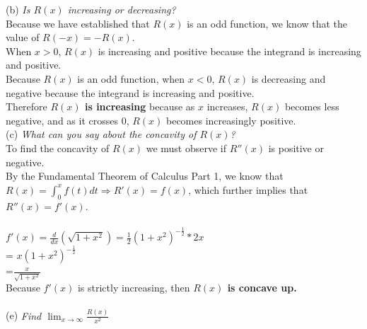 \documentclass[12pt]{article}
\begin{document}
\noindent (b) \textit{Is $R(x)$ increasing or decreasing?}\\
Because we have established that $R(x)$ is an odd function, we know that the value of $R(-x) = -R(x)$.\\
When $x>0$, $R(x)$ is increasing and positive because the integrand is increasing and positive.\\
Because $R(x)$ is an odd function, when $x<0$, $R(x)$ is decreasing and negative because the integrand is increasing and positive. \\
Therefore \textbf{$R(x)$ is increasing} because as $x$ increases, $R(x)$ becomes less negative, and as it crosses 0, $R(x)$ becomes increasingly positive. \\

\noindent (c) \textit{What can you say about the concavity of $R(x)$?}\\
To find the concavity of $R(x)$ we must observe if $R''(x)$ is positive or negative. \\
By the Fundamental Theorem of Calculus Part 1, we know that $R(x) = \int_{0}^{x}f(t)dt \Rightarrow R'(x) = f(x)$, which further implies that $R''(x) = f'(x)$.\\
\\
$f'(x) = \frac{d}{dx}(\sqrt{1+x^2}) = \frac{1}{2}(1+x^2)^{-\frac{1}{2}}*2x$\\
= $x(1+x^2)^{-\frac{1}{2}}$\\
=$\frac{x}{\sqrt{1+x^2}}$ \\


\noindent Because $f'(x)$ is strictly increasing, then \textbf{$R(x)$ is concave up.}\\
\\
(e) \textit{Find $\lim_{x\to\infty}\frac{R(x)}{x^2}$} \\
\end{document}
